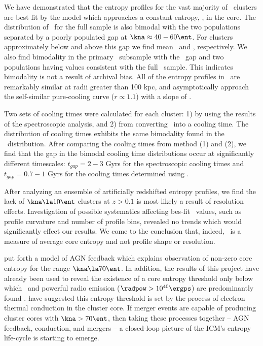 \documentclass{emulateapj}
\begin{document}
We have demonstrated that the entropy profiles for the vast majority
of \accept\ clusters are best fit by the model which approaches a
constant entropy, \kna, in the core. The distribution of \kna\ for the
full sample is also bimodal with the two populations separated by a
poorly populated gap at $\kna \approx 40-60 \ent$. For clusters
approximately below and above this gap we find mean \knaga\ and
\knagb, respectively. We also find bimodality in the primary
\hifl\ subsample with the \kna\ gap and two populations having values
consistent with the full \accept\ sample. This indicates bimodality is
not a result of archival bias. All of the entropy profiles in
\accept\ are remarkably similar at radii greater than 100 kpc, and
asymptotically approach the self-similar pure-cooling curve ($r
\propto 1.1$) with a slope of \alphafs.

Two sets of cooling times were calculated for each cluster: 1) by
using the results of the spectroscopic analysis, and 2) from
converting \kna\ into a cooling time. The distribution of cooling
times exhibits the same bimodality found in the \kna\ distribution.
After comparing the cooling times from method (1) and (2), we find
that the gap in the bimodal cooling time distributions occur at
significantly different timescales: $t_{gap} = 2-3$ Gyrs for the
spectroscopic cooling times and $t_{gap} = 0.7-1$ Gyrs for the cooling
times determined using \kna.

After analyzing an ensemble of artificially redshifted entropy
profiles, we find the lack of $\kna \la 10 \ent$ clusters at $z > 0.1$
is most likely a result of resolution effects. Investigation of
possible systematics affecting bes-fit \kna\ values, such as profile
curvature and number of profile bins, revealed no trends which would
significantly effect our results. We come to the conclusion that,
indeed, \kna\ is a measure of average core entropy and not profile
shape or resolution.

\cite{agnframework} put forth a model of AGN feedback which explains
observation of non-zero core entropy for the range $\kna \la 70
\ent$. In addition, the results of this project have already been used
to reveal the existence of a core entropy threshold only below which
\halpha\ and powerful radio emission ($\radpow > 10^{40} \ergps$) are
predominantly found \citep{haradent}. \cite{conduction} have suggested
this entropy threshold is set by the process of electron thermal
conduction in the cluster core. If merger events are capable of
producing cluster cores with $\kna > 70 \ent$, then taking these
processes together -- AGN feedback, conduction, and mergers -- a
closed-loop picture of the ICM's entropy life-cycle is starting to
emerge.
\end{document}
